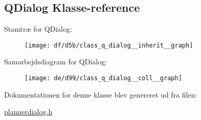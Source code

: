 \hypertarget{class_q_dialog}{}\subsection{Q\+Dialog Klasse-\/reference}
\label{class_q_dialog}


Stamtræ for Q\+Dialog\+:
\nopagebreak
\begin{figure}[H]
\begin{center}
\leavevmode
\texttt{[image: df/d5b/class\_q\_dialog\_\_inherit\_\_graph]}
\end{center}
\end{figure}


Samarbejdsdiagram for Q\+Dialog\+:
\nopagebreak
\begin{figure}[H]
\begin{center}
\leavevmode
\texttt{[image: de/d99/class\_q\_dialog\_\_coll\_\_graph]}
\end{center}
\end{figure}


Dokumentationen for denne klasse blev genereret ud fra filen\+:\begin{DoxyCompactItemize}
\item 
\hyperlink{plannerdialog_8h}{plannerdialog.\+h}\end{DoxyCompactItemize}
